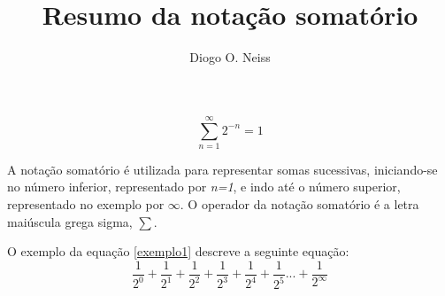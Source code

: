 \documentclass[14pt]{article}
\begin{document}
 

\title{Resumo da notação somatório}

\author{Diogo O. Neiss }
  

\address{Graduando em Ciência da Computação \\
Pontifícia Universidade Católica de Minas Gerais
(PUC MG)\\
Av. Dom José Gaspar, 500 Coração Eucarístico - Belo Horizonte - MG 30535-901, Brasil\\
}

\maketitle
     

\begin{equation}\label{exemplo1}
 \sum\limits_{n=1}^{\infty} 2^{-n} = 1   
\end{equation}

A notação somatório é utilizada para representar somas sucessivas, iniciando-se no número inferior, representado por \textit{n=1}, e indo até o número superior, representado no exemplo por \textit{$\infty$}. O operador da notação somatório é a letra maiúscula grega sigma, \large$\sum$.

O exemplo da equação \ref{exemplo1} descreve a seguinte equação:
\begin{equation}\label{descricaoExemplo}
 \frac{1}{2^0} + \frac{1}{2^1} + \frac{1}{2^2} + \frac{1}{2^3} + \frac{1}{2^4} + \frac{1}{2^5} ... + \frac{1}{2^{\infty}}
\end{equation}

\end{document}
